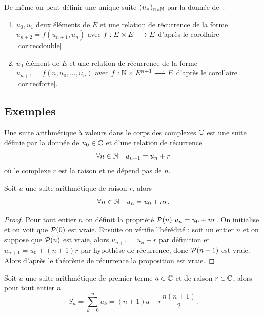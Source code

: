 De même on peut définir une unique suite \((u_n)_{n\in\N}\) par la donnée de~:
\begin{enumerate}
  \item \(u_0, u_1\) deux éléments de \(E\) et une relation de récurrence de la 
    forme \(u_{n + 2}=f(u_{n + 1},u_{n})\) avec \(\fonctionR{f}{E\times E}{E}\) d'après 
    le corollaire~
    \ref{cor:recdouble}.
  \item \(u_0\) élément de \(E\) et une relation de récurrence de la forme 
    \(u_{n + 1}=f(n, u_{0},\ldots, u_{n})\) avec \(\fonctionR{f}{\N\times 
    E^{n + 1}}{E}\) 
    d'après le corollaire~
    \ref{cor:recforte}.
\end{enumerate}

\subsection{Exemples}
\begin{defdef}
  Une suite arithmétique à valeurs dans le corps des complexes \(\C\) est une 
  suite définie par la donnée de \(u_0\in\C\) et d'une relation de récurrence 
  \begin{equation}
    \forall n \in \N \quad u_{n + 1}=u_n + r
  \end{equation}
  où le complexe \(r\) est la raison et ne dépend pas de \(n\).
\end{defdef}

\begin{prop}
  Soit \(u\) une suite arithmétique de raison \(r\), alors
  \begin{equation}
    \forall n \in \N \quad u_n = u_0 + nr.
  \end{equation}
\end{prop}

\begin{proof}
  Pour tout entier \(n\) on définit la propriété \(\P(n) \ u_n = u_0 + nr\). On 
  initialise et on voit que \(\P(0)\) est vraie. Ensuite on vérifie l'hérédité : 
  soit un entier \(n\) et on suppose que \(\P(n)\) est vraie, alors 
  \(u_{n + 1}=u_n + r\) par définition et \(u_{n + 1}=u_0 + (n + 1)r\) par hypothèse de 
  récurrence, donc \(\P(n + 1)\) est vraie. Alors d'après le théorème de 
  récurrence la proposition est vraie.
\end{proof}

\begin{prop}
  Soit \(u\) une suite arithmétique de premier terme \(a\in\C\) et de raison 
  \(r\in\C\), alors pour tout entier \(n\)
  \begin{equation}
    S_n = \sum_{k = 0}^n u_k = (n + 1)a + r\frac{n(n + 1)}{2}.
  \end{equation}
\end{prop}

